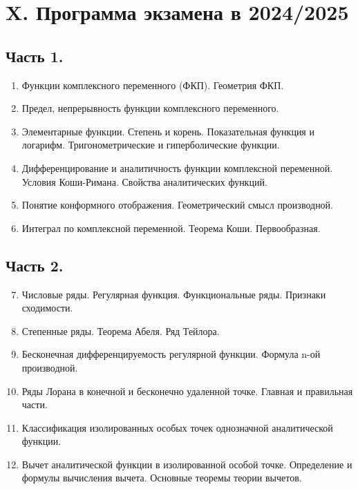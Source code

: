 \clearpage

\section{X. Программа экзамена в 2024/2025}

\subsection{Часть 1.}

\begin{enumerate}
    \item Функции комплексного переменного (ФКП). Геометрия ФКП.
    \item Предел, непрерывность функции комплексного переменного.
    \item Элементарные функции. Степень и корень. Показательная функция и логарифм. Тригонометрические и гиперболические функции.
    \item Дифференцирование и аналитичность функции комплексной переменной. Условия Коши-Римана. Свойства аналитических функций.
    \item Понятие конформного отображения. Геометрический смысл производной.
    \item Интеграл по комплексной переменной. Теорема Коши. Первообразная.
\end{enumerate}

    

\subsection{Часть 2.}

\begin{enumerate}
    \setcounter{enumi}{6}

    \item Числовые ряды. Регулярная функция. Функциональные ряды. Признаки сходимости.
    \item Степенные ряды. Теорема Абеля. Ряд Тейлора.
    \item Бесконечная дифференцируемость регулярной функции. Формула n-ой производной.
    \item Ряды Лорана в конечной и бесконечно удаленной точке. Главная и правильная части.
    \item Классификация изолированных особых точек однозначной аналитической функции.
    \item Вычет аналитической функции в изолированной особой точке. Определение и формулы вычисления вычета. Основные теоремы теории вычетов.
\end{enumerate}